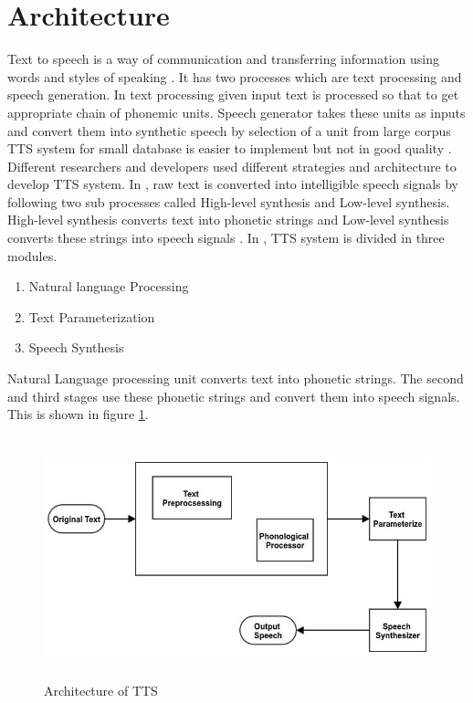 \section{Architecture}
Text to speech is a way of communication and transferring information using words and styles of
speaking \cite{eide2004corpus}. It has two processes which are text processing and speech
generation. In text processing given input text is processed so that to get appropriate chain of
phonemic units. Speech generator takes these units as inputs and convert them into synthetic
speech by selection of a unit from large corpus TTS system for small database is easier to
implement but not in good quality \cite{black2007statistical, zen2007hmm, raj2007text}.
Different researchers and developers used different strategies and architecture to develop TTS system. In \cite{kabir2002natural}, raw text is converted into intelligible speech signals by following two sub processes called High-level synthesis and Low-level synthesis. High-level
synthesis converts text into phonetic strings and Low-level synthesis converts these strings into
speech signals \cite{kabir2002natural}. In \cite{hussain2005phonological}, TTS system is divided in three modules.

\begin{enumerate}
  \item Natural language Processing
  \item Text Parameterization
  \item Speech Synthesis
\end{enumerate}

Natural Language processing unit converts text into phonetic strings. The second and
third stages use these phonetic strings and convert them into speech signals. This is shown in figure \ref{fig:Architecture of TTS}.

\begin{figure}
  \centering
  \includegraphics[width=\linewidth, height=7cm,keepaspectratio]{images/tts_block_dg.jpg}
  \caption{Architecture of TTS}
  \label{fig:Architecture of TTS}
\end{figure}

